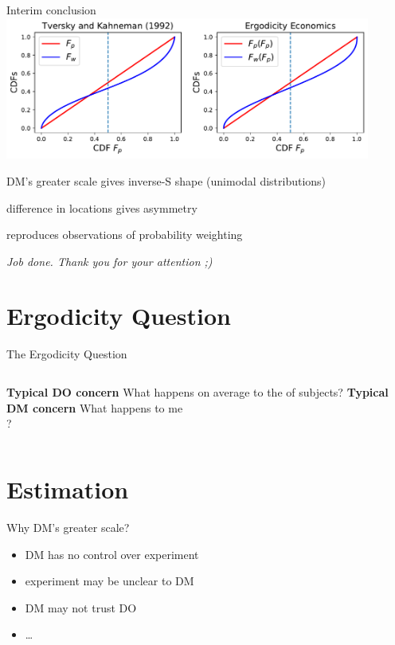 \begin{frame}{Interim conclusion}
\label{InterimConclusion}
\centering \includegraphics[width=0.9\textwidth]{../../figs/KT_vs_Our_result_LocScale.pdf}

\bi
	\item DM's greater scale gives inverse-S shape (unimodal distributions)
	\item difference in locations gives asymmetry
	\item reproduces observations of probability weighting
	\item[]
	\item[] \textit{Job done. Thank you for your attention ;)}
\ei
\end{frame}

\section{Ergodicity Question}

\begin{frame}{The Ergodicity Question}
\begin{columns}[T]
	\bc \textbf{Typical DO concern} \ec
	What happens on average to the  of subjects?
\centering \vspace{4em}  \red{\large $\neq$}
	\bc \textbf{Typical DM concern} \ec
	What happens to me \\
	?
\end{columns}
\end{frame}


\section{Estimation}

\begin{frame}{Why DM's greater scale?}
\begin{itemize}
  \item DM has no control over experiment
  \item experiment may be unclear to DM
  \item DM may not trust DO
  \item \ldots
\end{itemize}
\end{frame}

